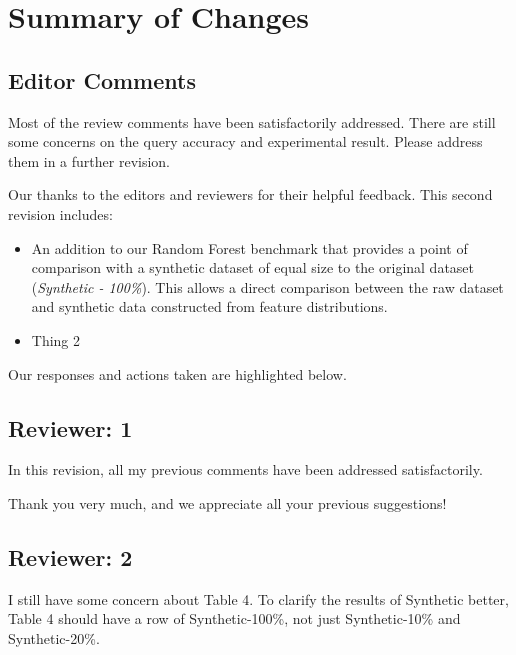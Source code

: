 \documentclass{article}
\begin{document}
\section*{Summary of Changes}\label{summary-of-changes}
\subsection*{Editor Comments}\label{editor-comments}

Most of the review comments have been satisfactorily addressed. There are still some concerns on the query accuracy and experimental result. Please address them in a further revision.

\begin{tcolorbox}
    Our thanks to the editors and reviewers for their helpful feedback. This second revision includes:

\begin{itemize}
    \item An addition to our Random Forest benchmark that provides a point of comparison with a synthetic dataset of equal size to the original dataset (\emph{Synthetic - 100\%}). This allows a direct comparison between the raw dataset and synthetic data constructed from feature distributions.

\item Thing 2
\end{itemize}
%
Our responses and actions taken are highlighted below.
\end{tcolorbox}

\subsection*{Reviewer: 1}\label{reviewer-1}

In this revision, all my previous comments have been addressed satisfactorily.

\begin{tcolorbox}
    Thank you very much, and we appreciate all your previous suggestions!
\end{tcolorbox}

\subsection*{Reviewer: 2}\label{reviewer-2}

I still have some concern about Table 4. To clarify the results of Synthetic better, Table 4 should have a row of Synthetic-100\%, not just Synthetic-10\% and Synthetic-20\%.
\end{document}
